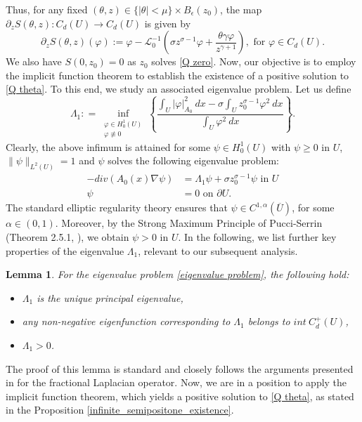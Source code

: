 \documentclass[reqno,oneside]{amsart}
\newtheorem{lemma}[theorem]{Lemma}
\theoremstyle{definition}
\theoremstyle{remark}
\numberwithin{equation}{section}
\newcommand{\pa}{\partial}
\newcommand{\rar}{\rightarrow}
\newcommand{\na} {\nabla}
\newcommand{\si}{\sigma}
\newcommand{\ball}{B_{\epsilon} (z_0)}
\newcommand{\intcd}{int\ C_d^+ (U)}
\newcommand{\li}{\mathcal{L}_0^{-1}}
\begin{document}
Thus, for any fixed $(\theta,z)\in \{|\theta|<\mu\} \times \ball$, the map $\pa_z S(\theta,z): C_d (U) \rar C_d (U)$ is given by
\begin{equation}
    \pa_z S(\theta,z)(\varphi):= \varphi- \li \left(\si z^{\si -1}\varphi + \frac{\theta \gamma \varphi}{z^{\gamma +1}} \right), \text{ for } \varphi\in C_d (U).
\end{equation}
We also have $S(0, z_0) =0$ as $z_0$ solves \eqref{Q zero}. Now, our objective is to employ the implicit function theorem to establish the existence of a positive solution to \eqref{Q theta}. To this end, we study an associated eigenvalue problem. Let us define
\[\Lambda_1: = \inf_{\substack{\varphi\in H^1_0 (U) \\ \varphi \not\equiv 0}} \left\{\frac{\int_{U} |\varphi|^2_{A_0}\ dx - \si \int_{U} z_0^{\si -1} \varphi^2\ dx}{\int_{U} \varphi^2\ dx} \right\}.\]
Clearly, the above infimum is attained for some $\psi \in H^1_0 (U)$ with $\psi \geq 0$ in $U$, $\|\psi\|_{L^2 (U)} =1$ and $\psi$ solves the following eigenvalue problem:
\begin{equation}\label{eigenvalue problem}
    \begin{aligned}
        -div \left(A_0 (x) \na \psi \right) &= \Lambda_1 \psi + \si z_0^{\si -1} \psi \text{ in } U\\
        \psi &= 0 \text{ on } \pa U.
    \end{aligned}
\end{equation}
The standard elliptic regularity theory ensures that $\psi \in C^{1,\alpha} (\overline{U})$, for some $\alpha \in (0,1)$. Moreover, by the Strong Maximum Principle of Pucci-Serrin (Theorem 2.5.1, \cite{pucci2007maximum}), we obtain $\psi >0$ in $U$. In the following, we list further key properties of the eigenvalue $\Lambda_1$, relevant to our subsequent analysis.

\begin{lemma}
    For the eigenvalue problem \eqref{eigenvalue problem}, the following hold:
    \begin{itemize}
        \item[(a)] $\Lambda_1$ is the unique principal eigenvalue,
        \item[(b)] any non-negative eigenfunction corresponding to $\Lambda_1$ belongs to $\intcd$,
        \item[(c)] $\Lambda_1 >0$.
    \end{itemize}
\end{lemma}

The proof of this lemma is standard and closely follows the arguments presented in \cite{giacomoni2019existence} for the fractional Laplacian operator. Now, we are in a position to apply the implicit function theorem, which yields a positive solution to \eqref{Q theta}, as stated in the Proposition \ref{infinite_semipositone_existence}.
\vspace{5pt}
\end{document}
